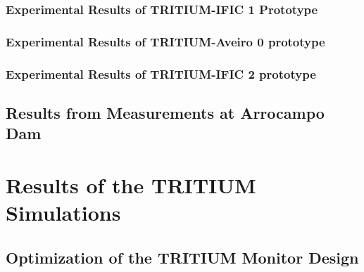 \documentclass[12pt,a4paper]{book}
\begin{document}
		\subsection[Experimental Results of TRITIUM-IFIC 1]{Experimental Results of TRITIUM-IFIC 1 Prototype}\label{subsec:ResultsTritiumIFIC1}
		
		
		\subsection[Experimental Results of TRITIUM-Aveiro 0]{Experimental Results of TRITIUM-Aveiro 0 prototype}\label{subsec:ResultsTritiumAveiro}
		
		
		\subsection[Experimental Results of TRITIUM-IFIC 2]{Experimental Results of TRITIUM-IFIC 2 prototype}\label{subsec:ResultsTritiumIFIC2}
		
		
	\section[Experimental Results in Arrocampo Dam]{Results from Measurements at Arrocampo Dam}\label{sec:ResultsArrocampo}
	
	\newpage
		
	
	\chapter{Results of the TRITIUM Simulations}\label{chap:ResultsSimulations}
	
		
		\section[Optimization of the TRITIUM Monitor Design]{Optimization of the TRITIUM Monitor Design}\label{sec:ResultsTRITIUMSimulationsDesign}
				
		
\end{document}
